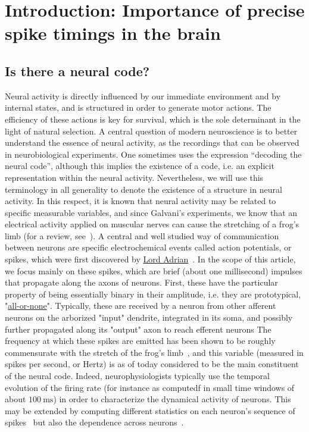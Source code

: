 \documentclass[brainsci, %
               review,submit,pdftex,moreauthors
               ]{Definitions/mdpi}
\newcommand{\ms}{\si{\milli\second}}%
\begin{document}
%
\section{Introduction: Importance of precise spike timings in the brain}\label{sec:time}
%
\subsection{Is there a neural code?}
Neural activity is directly influenced by our immediate environment and by internal states, and is structured in order to generate motor actions. The efficiency of these actions is key for survival, which is the sole determinant in the light of natural selection. A central question of modern neuroscience is to better understand the essence of neural activity, as the recordings that can be observed in neurobiological experiments. One sometimes uses the expression ``decoding the neural code'', although this implies the existence of a code, i.e. an explicit representation within the neural activity. Nevertheless, we will use this terminology in all generality to denote the existence of a structure in neural activity. In this respect, it is known that neural activity may be related to specific measurable variables, and since Galvani's experiments, we know that an electrical activity applied on muscular nerves can cause the stretching of a frog's limb (for a review, see~\citep{piccolino_luigi_1997}). A central and well studied way of communication between neurons are specific electrochemical events called action potentials, or spikes, which were first discovered by \href{https://en.wikipedia.org/wiki/Edgar_Adrian}{Lord Adrian}~\citep{adrian_impulses_1926}. In the scope of this article, we focus mainly on these spikes, which are brief (about one millisecond) impulses that propagate along the axons of neurons. First, these have the particular property of being essentially binary in their amplitude, i.e. they are prototypical, "\href{https://en.wikipedia.org/wiki/All-or-none_law}{all-or-none}". Typically, these are received by a neuron from other afferent neurons on the arborized "input" dendrite, integrated in its soma, and possibly further propagated along its "output" axon to reach efferent neurons The frequency at which these spikes are emitted has been shown to be roughly commensurate with the stretch of the frog's limb~\citep{adrian_impulses_1926}, and this variable (measured in spikes per second, or Hertz) is as of today considered to be the main constituent of the neural code. Indeed, neurophysiologists typically use the temporal evolution of the firing rate (for instance as computedf in small time windows of about $100~\ms$) in order to characterize the dynamical activity of neurons. This may be extended by computing different statistics on each neuron's sequence of spikes~\citep{perkel_neuronal_1967} but also the dependence across neurons~\citep{perkel_neuronal_1967-1}. 
\end{document}
